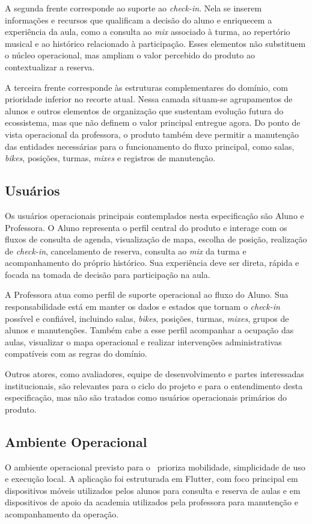 A segunda frente corresponde ao suporte ao \textit{check-in}. Nela se inserem informações e recursos que qualificam a decisão do aluno e enriquecem a experiência da aula, como a consulta ao \textit{mix} associado à turma, ao repertório musical e ao histórico relacionado à participação. Esses elementos não substituem o núcleo operacional, mas ampliam o valor percebido do produto ao contextualizar a reserva.

A terceira frente corresponde às estruturas complementares do domínio, com prioridade inferior no recorte atual. Nessa camada situam-se agrupamentos de alunos e outros elementos de organização que sustentam evolução futura do ecossistema, mas que não definem o valor principal entregue agora. Do ponto de vista operacional da professora, o produto também deve permitir a manutenção das entidades necessárias para o funcionamento do fluxo principal, como salas, \textit{bikes}, posições, turmas, \textit{mixes} e registros de manutenção.

\subsection{Usuários}
Os usuários operacionais principais contemplados nesta especificação são Aluno e Professora. O Aluno representa o perfil central do produto e interage com os fluxos de consulta de agenda, visualização de mapa, escolha de posição, realização de \textit{check-in}, cancelamento de reserva, consulta ao \textit{mix} da turma e acompanhamento do próprio histórico. Sua experiência deve ser direta, rápida e focada na tomada de decisão para participação na aula.

A Professora atua como perfil de suporte operacional ao fluxo do Aluno. Sua responsabilidade está em manter os dados e estados que tornam o \textit{check-in} possível e confiável, incluindo salas, \textit{bikes}, posições, turmas, \textit{mixes}, grupos de alunos e manutenções. Também cabe a esse perfil acompanhar a ocupação das aulas, visualizar o mapa operacional e realizar intervenções administrativas compatíveis com as regras do domínio.

Outros atores, como avaliadores, equipe de desenvolvimento e partes interessadas institucionais, são relevantes para o ciclo do projeto e para o entendimento desta especificação, mas não são tratados como usuários operacionais primários do produto.

\subsection{Ambiente Operacional}
O ambiente operacional previsto para o \ProjetoNome\ prioriza mobilidade, simplicidade de uso e execução local. A aplicação foi estruturada em Flutter, com foco principal em dispositivos móveis utilizados pelos alunos para consulta e reserva de aulas e em dispositivos de apoio da academia utilizados pela professora para manutenção e acompanhamento da operação.

